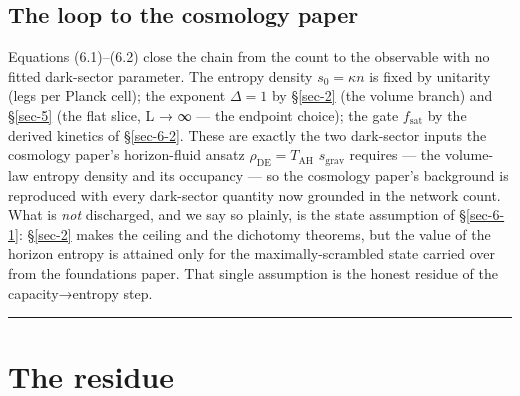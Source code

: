 \documentclass[aps,prd,preprint,nofootinbib,superscriptaddress]{revtex4-2}
\begin{document}
\subsection{The loop to the cosmology paper}\label{sec-6-4}

Equations (6.1)--(6.2) close the chain from the count to the observable
with no fitted dark-sector parameter. The entropy density
\(s_{0} = \kappa n\) is fixed by unitarity (legs per Planck cell); the
exponent \(\Delta  = 1\) by §\ref{sec-2} (the volume branch) and
§\ref{sec-5} (the flat slice, L → ∞ --- the endpoint choice); the gate
\(f_{\mathrm{sat}}\) by the derived kinetics of §\ref{sec-6-2}. These
are exactly the two dark-sector inputs the cosmology paper's
horizon-fluid ansatz \(\rho _\mathrm{DE} = T_\mathrm{AH}\)
\(s_{\mathrm{grav}}\) requires --- the volume-law entropy density and
its occupancy --- so the cosmology paper's background is reproduced with
every dark-sector quantity now grounded in the network count. What is
\emph{not} discharged, and we say so plainly, is the state assumption of
§\ref{sec-6-1}: §\ref{sec-2} makes the ceiling and the dichotomy
theorems, but the value of the horizon entropy is attained only for the
maximally-scrambled state carried over from the foundations paper. That
single assumption is the honest residue of the capacity→entropy step.

\begin{center}\rule{0.5\linewidth}{0.5pt}\end{center}

\section{The residue}\label{sec-7}
\end{document}
